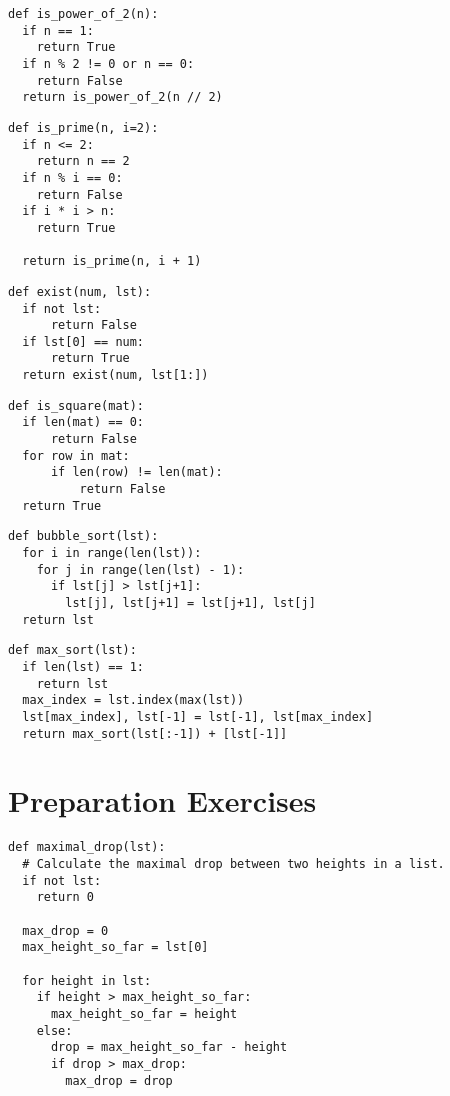 \documentclass[11pt]{article}
\begin{document}
\begin{multicols}{2}
\begin{multicols}{2}
\begin{lstlisting}
def is_power_of_2(n):
  if n == 1:
    return True
  if n % 2 != 0 or n == 0:
    return False
  return is_power_of_2(n // 2)
\end{lstlisting}

\begin{lstlisting}
def is_prime(n, i=2):
  if n <= 2:
    return n == 2
  if n % i == 0:
    return False
  if i * i > n:
    return True
      
  return is_prime(n, i + 1)
\end{lstlisting}

\begin{lstlisting}
def exist(num, lst):
  if not lst:
      return False
  if lst[0] == num:
      return True
  return exist(num, lst[1:])
\end{lstlisting}

\begin{lstlisting}
def is_square(mat):
  if len(mat) == 0:
      return False
  for row in mat:
      if len(row) != len(mat):
          return False
  return True
\end{lstlisting}

\begin{lstlisting}
def bubble_sort(lst):
  for i in range(len(lst)):
    for j in range(len(lst) - 1):
      if lst[j] > lst[j+1]:
        lst[j], lst[j+1] = lst[j+1], lst[j]
  return lst
\end{lstlisting}
\end{multicols}
\vspace{-0.5cm}
\begin{lstlisting}
def max_sort(lst):
  if len(lst) == 1:
    return lst
  max_index = lst.index(max(lst))
  lst[max_index], lst[-1] = lst[-1], lst[max_index]
  return max_sort(lst[:-1]) + [lst[-1]]
\end{lstlisting}

\section{Preparation Exercises}\label{sec:preparation-exercises}
\begin{lstlisting}
def maximal_drop(lst):
  # Calculate the maximal drop between two heights in a list.
  if not lst:
    return 0

  max_drop = 0
  max_height_so_far = lst[0]

  for height in lst:
    if height > max_height_so_far:
      max_height_so_far = height
    else:
      drop = max_height_so_far - height
      if drop > max_drop:
        max_drop = drop


\end{lstlisting}
\end{multicols}
\end{document}
